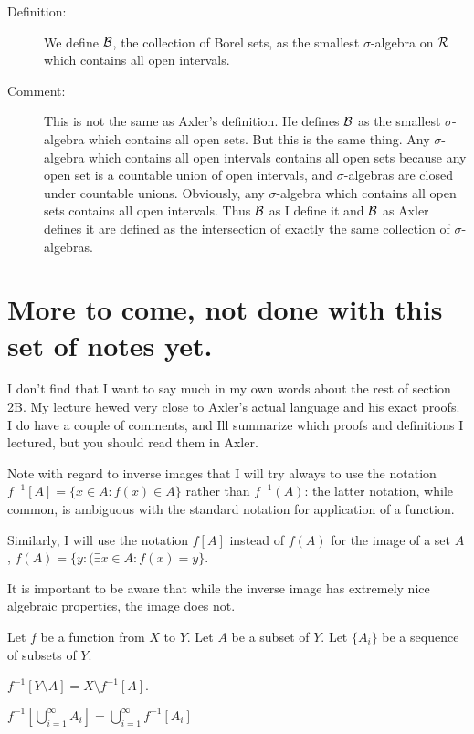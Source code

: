 \documentclass[12pt]{article}
\begin{document}
\begin{description}

\item[Definition:]  We define $\cal B$, the collection of Borel sets, as the smallest $\sigma$-algebra on $\cal R$ which contains all open intervals.

\item[Comment:]  This is not the same as Axler's definition.  He defines $\cal B$ as the smallest $\sigma$-algebra which contains all open sets.  But this is the same thing.
Any $\sigma$-algebra which contains all open intervals contains all open sets because any open set is a countable union of open intervals, and $\sigma$-algebras are closed under countable unions.  Obviously, any $\sigma$-algebra which contains all open sets contains all open intervals.  Thus $\cal B$ as I define it and $\cal B$ as Axler defines it are defined as the intersection of exactly the same collection of $\sigma$-algebras.

\end{description}

\section{More to come, not done with this set of notes yet.}

I don't find that I want to say much in my own words about the rest of section 2B.  My lecture hewed very close to Axler's actual language and his exact proofs.  I do have a couple of comments, and Ill summarize which proofs and definitions I lectured, but you should read them in Axler.

Note with regard to inverse images that I will try always to use the notation $f^{-1}[A] = \{x \in A:f(x) \in A\}$ rather than $f^{-1}(A)$:  the latter notation, while common, is ambiguous with the standard notation for application of a function.

Similarly, I will use the notation $f[A]$ instead of $f(A)$ for the image of a set $A$, $f(A) = \{y:(\exists x\in A:f(x)=y\}$.

It is important to be aware that while the inverse image has extremely nice algebraic properties, the image does not.

Let $f$ be a function from $X$ to $Y$.  Let $A$ be a subset of $Y$.  Let $\{A_i\}$ be a sequence of subsets of $Y$.

$f^{-1}[Y \setminus A] = X \setminus f^{-1}[A]$.

$f^{-1}[\bigcup_{i=1}^\infty A_i] = \bigcup_{i=1}^\infty f^{-1}[A_i]$
\end{document}
